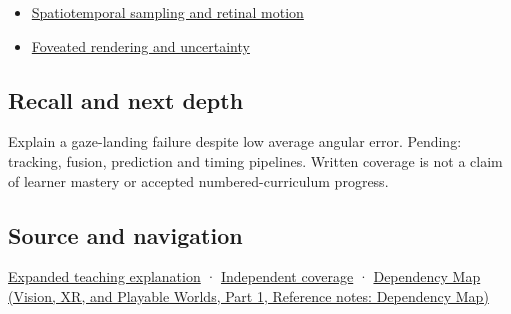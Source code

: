 \begin{itemize}
\tightlist
\item
  \hyperref[appendix-70895739febb]{Spatiotemporal sampling and retinal motion}
\item
  \hyperref[appendix-5878b813b732]{Foveated rendering and uncertainty}
\end{itemize}

\subsection{Recall and next depth}\label{appendix-a6f2c4fe1996-recall-and-next-depth}

\hypertarget{appendix-a6f2c4fe1996-recall-and-next-depth}{}

Explain a gaze-landing failure despite low average angular error. Pending: tracking, fusion, prediction and timing pipelines. Written coverage is not a claim of learner mastery or accepted numbered-curriculum progress.

\subsection{Source and navigation}\label{appendix-a6f2c4fe1996-source-and-navigation}

\hypertarget{appendix-a6f2c4fe1996-source-and-navigation}{}

\hyperref[04-visual-computing-ii-ch042-a-gaze-sample-needs-a-time-as-well-as-a-direction]{Expanded teaching explanation} · \hyperref[appendix-fd090d982a15-xr01---independent-seeing-and-representation-source]{Independent coverage} · \href{../07-Vision-XR-and-Playable-Worlds-P01/main.pdf\#nameddest=appendix-4ad47bdd269a}{Dependency Map (Vision, XR, and Playable Worlds, Part 1, Reference notes: Dependency Map)}
